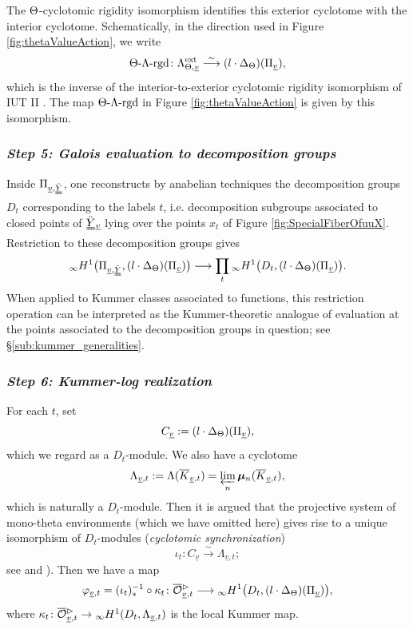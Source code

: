 \documentclass[12pt, reqno, a4paper]{amsart}
\def\udl#1{\underline{#1}} %
\def\longto{\longrightarrow}
\def\simlongto{\stackrel{\sim}{\longrightarrow}} %
\def\uv{\udl{v}} %
\def\La{\Lambda} %
\def\bmu{\bm{\mu}}
\def\infH{{}_{\infty}H} %
\begin{document}
The \(\Th\)-cyclotomic rigidity isomorphism identifies this exterior cyclotome with the interior cyclotome.  Schematically, in the direction used in Figure \ref{fig:thetaValueAction}, we write
\begin{equation}\label{eqn:thetaLambdaRgd}
  \Th\text{-}\Lambda\text{-}\mathrm{rgd}
  \colon
  \Lambda^{\mathrm{ext}}_{\Th,\uv}
  \simlongto
  (l\cdot\Delta_{\Th})(\Pi_{\uv}), 
\end{equation}
which is the inverse of the interior-to-exterior cyclotomic rigidity isomorphism of IUT II \cite[Prop.~1.3, pp.~236--237; Prop.~1.5(iii), pp.~240--241]{MR4225474}.
The map $\Th\text{-}\Lambda\text{-}\mathrm{rgd}$ in Figure \ref{fig:thetaValueAction} is given by this isomorphism.


\subsubsection{\emph{Step 5: Galois evaluation to decomposition groups}}\label{subsub:GaloisEvaluation}
Inside \(\Pi_{\uv,\dduuY}\), one reconstructs by anabelian techniques the decomposition groups \(D_t\) corresponding to the labels \(t\), i.e. decomposition subgroups associated to closed points of \(\dduuY{}_{\uv}\) lying over the points \(x_t\) of Figure \ref{fig:SpecialFiberOfuuX}.
Restriction to these decomposition groups gives
\begin{equation}\label{eqn:galoisEvaluationTheta}
  {}_{\infty}H^1\bigl(
    \Pi_{\uv,\dduuY},
    (l\cdot\Delta_{\Th})(\Pi_{\uv})
  \bigr)
  \longto
  \prod_t{}_{\infty}H^1\bigl(
    D_t,
    (l\cdot\Delta_{\Th})(\Pi_{\uv})
  \bigr).
\end{equation}
When applied to Kummer classes associated to functions, this restriction operation can be interpreted as the Kummer-theoretic analogue of evaluation at the points associated to the decomposition groups in question; see \S\ref{sub:kummer_generalities}.


\subsubsection{\emph{Step 6: Kummer-log realization}}\label{subsub:thetaValActStep6}
For each $t$, set 
$$
C_{\uv}:=(l\cdot\Delta_{\Th})(\Pi_{\uv}),
$$
which we regard as a $D_t$-module. 
We also have a cyclotome 
$$
\La_{\uv,t}:=\La(\oK_{\uv,t})=\varprojlim_n\bmu_n(\oK_{\uv,t}),
$$
which is naturally a $D_t$-module.
Then it is argued that the projective system of mono-theta environments (which we have omitted here) gives rise to a unique isomorphism of $D_t$-modules ({\it cyclotomic synchronization}) 
$$
\iota_t\colon C_{\uv}\simlongto\La_{\uv,t};
$$
see \cite[Cor.~2.19(i), pp.~289--291; Rem.~2.19.2, p.~293]{MR2512782} and \cite[Prop.~1.5(iii)--(iv), pp.~240--241]{MR4225474}).
Then we have a map 
$$
\varphi_{\uv,t}=(\iota_t)^{-1}_{\ast}\circ\kappa_t\colon \oOOt_{\uv,t}\longto{}_{\infty}H^1\bigl(D_t,(l\cdot\Delta_{\Th})(\Pi_{\uv})\bigr),
$$
where $\kappa_t\colon \oOOt_{\uv,t}\to\infH^1(D_t,\La_{\uv,t})$ is the local Kummer map.
\end{document}
